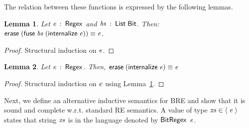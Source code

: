 \documentclass[sigplan, anonymous, review]{acmart}
\newtheorem{Lemma}{Lemma}
\theoremstyle{definition}
\newcommand{\D}[1]{\blue{\mathsf{#1}}}
\newcommand{\F}[1]{\green{\mathsf{#1}}}
\newcommand{\V}[1]{\purple{\mathit{#1}}}
\begin{document}
The relation between these functions is expressed by the following lemmas.
\begin{Lemma}\label{erase-fuse-lemma}
Let \ensuremath{\V{e}\;\mathbin{:}\;\D{Regex}} and \ensuremath{\V{bs}\;\mathbin{:}\;\D{List}\;\D{Bit}}. Then:\\  \ensuremath{\F{erase}\;(\F{fuse}\;\V{bs}\;(\F{internalize}\;\V{e}))\;\D{\equiv}\;\V{e}}.
\end{Lemma}
\begin{proof}
   Structural induction on \ensuremath{\V{e}}.
\end{proof}
\begin{Lemma}
Let \ensuremath{\V{e}\;\mathbin{:}\;\D{Regex}}. Then, \ensuremath{\F{erase}\;(\F{internalize}\;\V{e})\;\D{\equiv}\;\V{e}}
\end{Lemma}
\begin{proof}
  Structural induction on \ensuremath{\V{e}} using Lemma~\ref{erase-fuse-lemma}.
\end{proof}
Next, we define an alternative inductive semantics for BRE and show that it is 
sound and complete w.r.t. standard RE semantics. A value of type \ensuremath{\V{xs}\;\D{\in\langle}\;\V{e}\;\D{\rangle}} states
that string \ensuremath{\V{xs}} is in the language denoted by \ensuremath{\D{BitRegex}} \ensuremath{\V{e}}.
\end{document}
